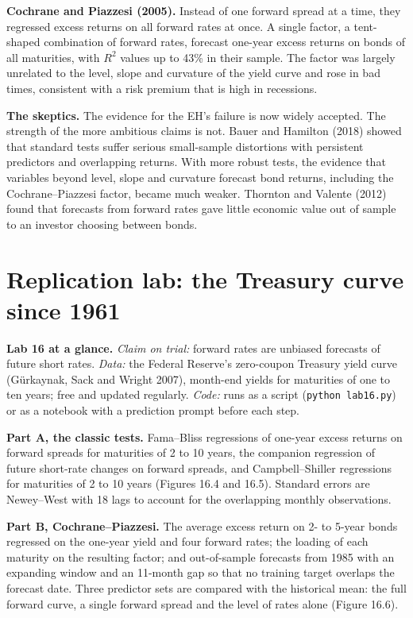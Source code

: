 \textbf{Cochrane and Piazzesi (2005).} Instead of one forward spread at a time, they regressed excess returns on all forward rates at once. A single factor, a tent-shaped combination of forward rates, forecast one-year excess returns on bonds of all maturities, with $R^2$ values up to 43\% in their sample. The factor was largely unrelated to the level, slope and curvature of the yield curve and rose in bad times, consistent with a risk premium that is high in recessions.

\textbf{The skeptics.} The evidence for the EH's failure is now widely accepted. The strength of the more ambitious claims is not. Bauer and Hamilton (2018) showed that standard tests suffer serious small-sample distortions with persistent predictors and overlapping returns. With more robust tests, the evidence that variables beyond level, slope and curvature forecast bond returns, including the Cochrane--Piazzesi factor, became much weaker. Thornton and Valente (2012) found that forecasts from forward rates gave little economic value out of sample to an investor choosing between bonds.

\section{Replication lab: the Treasury curve since 1961}
\label{sec:16-lab}

\begin{callout}
\textbf{Lab 16 at a glance.} \emph{Claim on trial:} forward rates are unbiased forecasts of future short rates. \emph{Data:} the Federal Reserve's zero-coupon Treasury yield curve (G\"urkaynak, Sack and Wright 2007), month-end yields for maturities of one to ten years; free and updated regularly. \emph{Code:} runs as a script (\texttt{python lab16.py}) or as a notebook with a prediction prompt before each step.
\end{callout}

\textbf{Part A, the classic tests.} Fama--Bliss regressions of one-year excess returns on forward spreads for maturities of 2 to 10 years, the companion regression of future short-rate changes on forward spreads, and Campbell--Shiller regressions for maturities of 2 to 10 years (Figures 16.4 and 16.5). Standard errors are Newey--West with 18 lags to account for the overlapping monthly observations.

\textbf{Part B, Cochrane--Piazzesi.} The average excess return on 2- to 5-year bonds regressed on the one-year yield and four forward rates; the loading of each maturity on the resulting factor; and out-of-sample forecasts from 1985 with an expanding window and an 11-month gap so that no training target overlaps the forecast date. Three predictor sets are compared with the historical mean: the full forward curve, a single forward spread and the level of rates alone (Figure 16.6).

